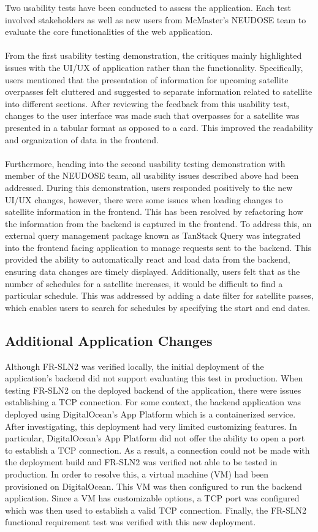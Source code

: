 \documentclass[12pt, titlepage]{article}
\begin{document}
Two usability tests have been conducted to assess the application. Each test involved stakeholders as well as new users from McMaster's NEUDOSE team to evaluate the core functionalities of the web application. 
\\ \\
From the first usability testing demonstration, the critiques mainly highlighted issues with the UI/UX of application rather than the functionality. Specifically, users mentioned that the presentation of information for upcoming satellite overpasses felt cluttered and suggested to separate information related to satellite into different sections. After reviewing the feedback from this usability test, changes to the user interface was made such that overpasses for a satellite was presented in a tabular format as opposed to a card. This improved the readability and organization of data in the frontend.
\\ \\ 
Furthermore, heading into the second usability testing demonstration with member of the NEUDOSE team, all usability issues described above had been addressed. During this demonstration, users responded positively to the new UI/UX changes, however, there were some issues when loading changes to satellite information in the frontend. This has been resolved by refactoring how the information from the backend is captured in the frontend. To address this, an external query management package known as TanStack Query was integrated into the frontend facing application to manage requests sent to the backend. This provided the ability to automatically react and load data from the backend, ensuring data changes are timely displayed. Additionally, users felt that as the number of schedules for a satellite increases, it would be difficult to find a particular schedule. This was addressed by adding a date filter for satellite passes, which enables users to search for schedules by specifying the start and end dates.

\subsection{Additional Application Changes}
Although FR-SLN2 was verified locally, the initial deployment of the application's backend did not support evaluating this test in production. When testing FR-SLN2 on the deployed backend of the application, there were issues establishing a TCP connection. For some context, the backend application was deployed using DigitalOcean's App Platform which is a containerized service. After investigating, this deployment had very limited customizing features. In particular, DigitalOcean's App Platform did not offer the ability to open a port to establish a TCP connection. As a result, a connection could not be made with the deployment build and FR-SLN2 was verified not able to be tested in production. In order to resolve this, a virtual machine (VM) had been provisioned on DigitalOcean. This VM was then configured to run the backend application. Since a VM has customizable options, a TCP port was configured which was then used to establish a valid TCP connection. Finally, the FR-SLN2 functional requirement test was verified with this new deployment.
\end{document}
